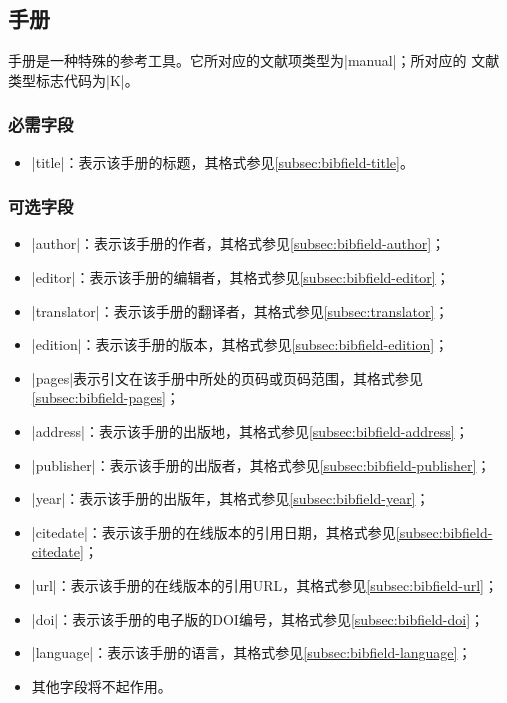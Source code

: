 \subsection{手册}\label{subsec:bibtype-manual}

手册是一种特殊的参考工具。它所对应的{\BibTeX}文献项类型为|manual|；所对应的
文献类型标志代码为|K|\cite{gbt3469-1983}。

\subsubsection{必需字段}

\begin{itemize}
\item |title|：表示该手册的标题，其格式参见\ref{subsec:bibfield-title}。
\end{itemize}

\subsubsection{可选字段}

\begin{itemize}
\item |author|：表示该手册的作者，其格式参见\ref{subsec:bibfield-author}；
\item |editor|：表示该手册的编辑者，其格式参见\ref{subsec:bibfield-editor}；
\item |translator|：表示该手册的翻译者，其格式参见\ref{subsec:translator}；
\item |edition|：表示该手册的版本，其格式参见\ref{subsec:bibfield-edition}；
\item |pages|表示引文在该手册中所处的页码或页码范围，其格式参见\ref{subsec:bibfield-pages}；
\item |address|：表示该手册的出版地，其格式参见\ref{subsec:bibfield-address}；
\item |publisher|：表示该手册的出版者，其格式参见\ref{subsec:bibfield-publisher}；
\item |year|：表示该手册的出版年，其格式参见\ref{subsec:bibfield-year}；
\item |citedate|：表示该手册的在线版本的引用日期，其格式参见\ref{subsec:bibfield-citedate}；
\item |url|：表示该手册的在线版本的引用URL，其格式参见\ref{subsec:bibfield-url}；
\item |doi|：表示该手册的电子版的DOI编号，其格式参见\ref{subsec:bibfield-doi}；
\item |language|：表示该手册的语言，其格式参见\ref{subsec:bibfield-language}；
\item 其他字段将不起作用。
\end{itemize}

